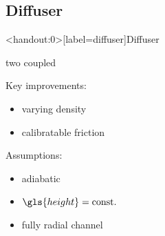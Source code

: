 \documentclass[compress, english]{beamer}%
\begin{document}
\subsection{Diffuser}
\begin{frame}<handout:0>[label=diffuser]{Diffuser\autocites{stanitz_one-dimensional_1952}[7]{schneider_analytical_2015}[77\psqq]{schiff_preliminary_2013}[51\psq]{galvas_fortran_1973}{oh_optimum_1997}[441]{schiffmann_design_2010}[10]{japikse_assessment_1985}}
\begin{minipage}{0.5\textwidth}
\begin{figure}
\def\svgwidth{1\textwidth}

\end{figure}
\pause
\centering
\textrightarrow{} two coupled 
\end{minipage}%
\hspace{\fill}%
\begin{minipage}{0.45\textwidth}
\pause
Key improvements:
\begin{itemize}
\item varying density
\item calibratable friction
\end{itemize}

\pause[\thebeamerpauses]
Assumptions:
\begin{itemize}
\item adiabatic
\item \(\gls{height} = \text{\const}\)
\item fully radial channel
\end{itemize}
\end{minipage}
\end{frame}
\end{document}
